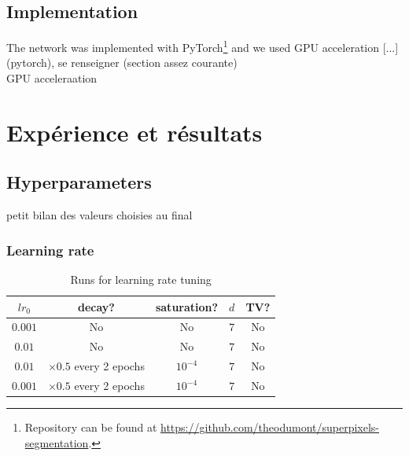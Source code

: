 \documentclass{article}
\begin{document}
    \subsection{Implementation}
    The network was implemented with PyTorch\footnote{Repository can be found at \url{https://github.com/theodumont/superpixels-segmentation}.} and we used GPU acceleration [...]\\
    (pytorch), se renseigner (section assez courante)\\
    GPU acceleraation




\section{Expérience et résultats}
    \subsection{Hyperparameters}
    petit bilan des valeurs choisies au final
        \subsubsection{Learning rate}
        \begin{table}[!ht]
            \center
            \begin{tabular}{|c|c|c|c|c|}
                \hline
                $lr_0$ & decay? & saturation? & $d$ & TV? \\
                \hline \hline
                $0.001$ & No & No & $7$ & No \\
                \hline
                $0.01$ & No & No & $7$ & No \\
                \hline
                $0.01$ & $\times 0.5$ every 2 epochs & $10^{-4}$ & $7$ & No \\
                \hline
                $0.001$ & $\times 0.5$ every 2 epochs & $10^{-4}$ & $7$ & No \\
                \hline
            \end{tabular}
        \caption{Runs for learning rate tuning}
        \end{table}
\end{document}
